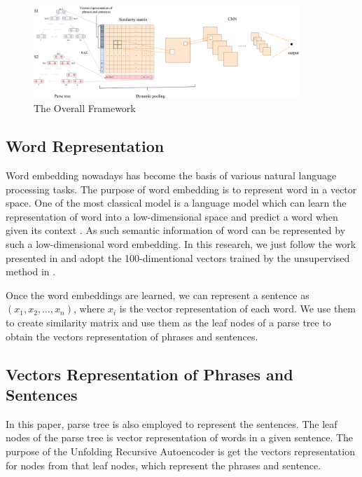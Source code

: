 \documentclass[conference]{IEEEtran}
\begin{document}
\begin{figure}
	\centering
	\includegraphics[width=0.9\textwidth]{figures/Overall}
	\caption{The Overall Framework}
	\label{fig:overall}
\end{figure}

\subsection{Word Representation}

Word embedding nowadays has become the basis of various natural language processing tasks. The purpose of word embedding is to represent word in a vector space. One of the most classical model is a language model which can learn the representation of word into a low-dimensional space and predict a word when given its context \cite{DBLP:conf/icml/MnihT12}. As such semantic information of word can be represented by such a low-dimensional word embedding. In this research, we just follow the work presented in \cite{DBLP:conf/nips/SocherHPNM11} and adopt the 100-dimentional vectors trained by the unsupervised method in \cite{DBLP:conf/icml/CollobertW08}. %

Once the word embeddings are learned, we can represent a sentence as $(x_1,x_2, \ldots,x_n)$, where $x_i$ is the vector representation of each word. We use them to create similarity matrix and use them as the leaf nodes of a parse tree to obtain the vectors representation of phrases and sentences.

\subsection{Vectors Representation of Phrases and Sentences}

In this paper, parse tree is also employed to represent the sentences. The leaf nodes of the parse tree is vector representation of words in a given sentence. The purpose of the Unfolding Recursive Autoencoder is get the vectors representation for nodes from that leaf nodes, which represent the phrases and sentence.
\end{document}
